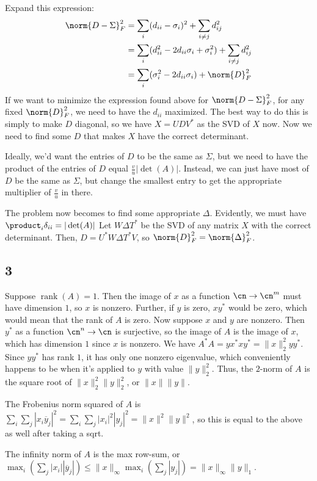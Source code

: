 \documentclass{article}
\newcommand{\conj}{\overline}
\DeclareMathOperator{\rank}{rank}
\begin{document}
Expand this expression: 
\begin{align*}
    \norm{D-\Sigma}_F^2&=\sum_i(d_{ii}-\sigma_i)^2+\sum_{i\neq j}d_{ij}^2\\
                       &=\sum_i(d_{ii}^2-2d_{ii}\sigma_i+\sigma_i^2)+\sum_{i\neq j}d_{ij}^2\\
                       &=\sum_i(\sigma_i^2-2d_{ii}\sigma_i)+\norm{D}_F^2
\end{align*}
If we want to minimize the expression found above for $\norm{D-\Sigma}_F^2$, for any fixed $\norm{D}_F^2$, we need to have the $d_{ii}$ maximized. The best way to do this is simply to make $D$ diagonal, so we have $X=UDV^*$ as the SVD of $X$ now. Now we need to find some $D$ that makes $X$ have the correct determinant.

Ideally, we'd want the entries of $D$ to be the same as $\Sigma$, but we need to have the product of the entries of $D$ equal $\frac{v}{u}|\det(A)|$. Instead, we can just have most of $D$ be the same as $\Sigma$, but change the smallest entry to get the appropriate multiplier of $\frac{v}{u}$ in there.

The problem now becomes to find some appropriate $\Delta$. Evidently, we must have $\product_i\delta_{ii}=|\det(A)|$
Let $W\Delta T^*$ be the SVD of any matrix $X$ with the correct determinant. Then, $D=U^*W\Delta T^*V$, so $\norm{D}_F^2=\norm{\Delta}_F^2$.
\subsection*{3}
Suppose $\rank(A)=1$. Then the image of $x$ as a function $\cn\to\cn^m$ must have dimension $1$, so $x$ is nonzero. Further, if $y$ is zero, $xy^*$ would be zero, which would mean that the rank of $A$ is zero. Now suppose $x$ and $y$ are nonzero. Then $y^*$ as a function $\cn^n\to\cn$ is surjective, so the image of $A$ is the image of $x$, which has dimension $1$ since $x$ is nonzero.
We have $A^*A=yx^*xy^*=\|x\|_2^2yy^*$. Since $yy^*$ has rank $1$, it has only one nonzero eigenvalue, which conveniently happens to be when it's applied to $y$ with value $\|y\|_2^2$. Thus, the $2$-norm of $A$ is the square root of $\|x\|^2_2\|y\|_2^2$, or $\|x\|\|y\|$. 

The Frobenius norm squared of $A$ is $\sum_i\sum_j|x_i\conj{y}_j|^2=\sum_i\sum_j|x_i|^2|y_j|^2=\|x\|^2\|y\|^2$, so this is equal to the above as well after taking a sqrt.

The infinity norm of $A$ is the max row-sum, or $\max_i\left(\sum_j|x_i||\conj{y}_j|\right)\leq\|x\|_\infty\max_i\left(\sum_j|y_j|\right)=\|x\|_\infty\|y\|_1$.
\end{document}
